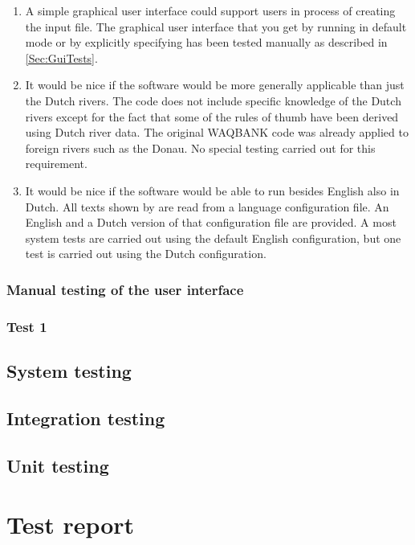 \begin{enumerate}
\item A simple graphical user interface could support users in process of creating the input file.
The graphical user interface that you get by running \dfastbe in default mode or by explicitly specifying  has been tested manually as described in \autoref{Sec:GuiTests}.

\item It would be nice if the software would be more generally applicable than just the Dutch rivers.
The code does not include specific knowledge of the Dutch rivers except for the fact that some of the rules of thumb have been derived using Dutch river data.
The original WAQBANK code was already applied to foreign rivers such as the Donau.
No special testing carried out for this requirement.

\item It would be nice if the software would be able to run besides English also in Dutch.
All texts shown by \dfastbe are read from a language configuration file.
An English and a Dutch version of that configuration file are provided.
A most system tests are carried out using the default English configuration, but one test is carried out using the Dutch configuration.

\end{enumerate}

\subsubsection{Manual testing of the user interface} \label{Sec:GuiTests}

\subsubsection{Test 1}

\subsection{System testing}

\subsection{Integration testing}

\subsection{Unit testing}

\section{Test report}

